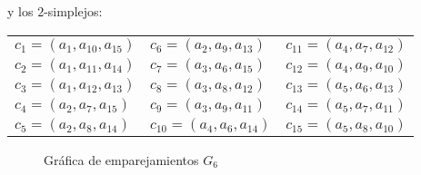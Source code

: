 \documentclass[12pt]{book}
\theoremstyle{definition}
\newcounter{in}
\begin{document}
y los $2$-simplejos:
\begin{center}
  \begin{tabular}[h]{lll}
    $c_{1}=(a_{1},a_{10},a_{15})$ & $c_{6}=(a_{2},a_{9},a_{13})$ & $c_{11}=(a_{4},a_{7},a_{12})$  \\
    $c_{2}=(a_{1},a_{11},a_{14})$ & $c_{7}=(a_{3},a_{6},a_{15})$ & $c_{12}=(a_{4},a_{9},a_{10})$  \\
    $c_{3}=(a_{1},a_{12},a_{13})$ & $c_{8}=(a_{3},a_{8},a_{12})$ & $c_{13}=(a_{5},a_{6},a_{13})$  \\
    $c_{4}=(a_{2},a_{7},a_{15})$ & $c_{9}=(a_{3},a_{9},a_{11})$ & $c_{14}=(a_{5},a_{7},a_{11})$  \\
    $c_{5}=(a_{2},a_{8},a_{14})$ & $c_{10}=(a_{4},a_{6},a_{14})$ & $c_{15}=(a_{5},a_{8},a_{10})$  
  \end{tabular}
\end{center}

\begin{figure}[h]
  \centering
  
  \caption{Gráfica de emparejamientos $G_{6}$}
  \label{fig:emparejamiento6}
\end{figure}
\end{document}
